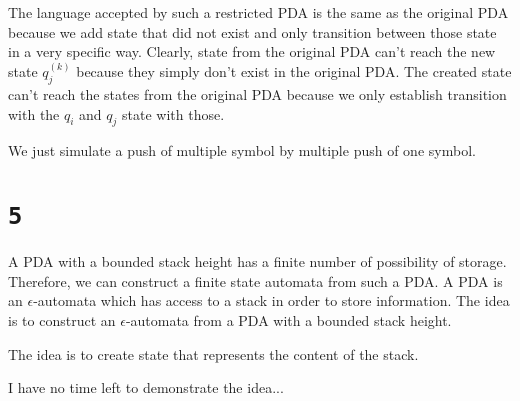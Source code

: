 \documentclass[a4paper,11pt]{report}
\begin{document}
The language accepted by such a restricted PDA is the same as the original PDA
because we add state that did not exist and only transition between those state
in a very specific way. Clearly, state from the original PDA can't reach the new
state $q_j^{(k)}$ because they simply don't exist in the original PDA. The
created state can't reach the states from the original PDA because we only
establish transition with the $q_i$ and $q_j$ state with those.

We just simulate a push of multiple symbol by multiple push of one symbol.

\section*{\texttt{5}}

A PDA with a bounded stack height has a finite number of possibility of storage.
Therefore, we can construct a finite state automata from such a PDA. A PDA is an
$\epsilon$-automata which has access to a stack in order to store information.
The idea is to construct an $\epsilon$-automata from a PDA with a bounded stack
height.

The idea is to create state that represents the content of the stack.

I have no time left to demonstrate the idea...
\end{document}
